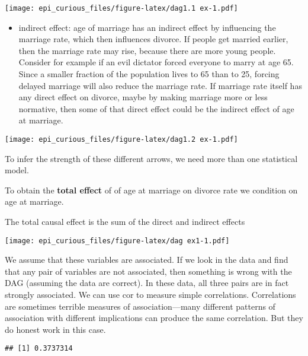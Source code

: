 \documentclass[
]{article}
\newenvironment{Shaded}{\begin{snugshade}}{\end{snugshade}}
\newcommand{\KeywordTok}[1]{\textcolor[rgb]{0.13,0.29,0.53}{\textbf{#1}}}
\newcommand{\NormalTok}[1]{#1}
\newcommand{\OperatorTok}[1]{\textcolor[rgb]{0.81,0.36,0.00}{\textbf{#1}}}
\providecommand{\tightlist}{%
  \setlength{\itemsep}{0pt}\setlength{\parskip}{0pt}}
\begin{document}
\texttt{[image: epi\_curious\_files/figure-latex/dag1.1 ex-1.pdf]}

\begin{itemize}
\tightlist
\item
  indirect effect: age of marriage has an indirect effect by influencing
  the marriage rate, which then influences divorce. If people get
  married earlier, then the marriage rate may rise, because there are
  more young people. Consider for example if an evil dictator forced
  everyone to marry at age 65. Since a smaller fraction of the
  population lives to 65 than to 25, forcing delayed marriage will also
  reduce the marriage rate. If marriage rate itself has any direct
  effect on divorce, maybe by making marriage more or less normative,
  then some of that direct effect could be the indirect effect of age at
  marriage.
\end{itemize}

\texttt{[image: epi\_curious\_files/figure-latex/dag1.2 ex-1.pdf]}

To infer the strength of these different arrows, we need more than one
statistical model.

To obtain the \textbf{total effect} of of age at marriage on divorce
rate we condition on age at marriage.

The total causal effect is the sum of the direct and indirect effects

\texttt{[image: epi\_curious\_files/figure-latex/dag ex1-1.pdf]}

We assume that these variables are associated. If we look in the data
and find that any pair of variables are not associated, then something
is wrong with the DAG (assuming the data are correct). In these data,
all three pairs are in fact strongly associated. We can use cor to
measure simple correlations. Correlations are sometimes terrible
measures of association---many different patterns of association with
different implications can produce the same correlation. But they do
honest work in this case.

\begin{Shaded}
\end{Shaded}

\begin{verbatim}
## [1] 0.3737314
\end{verbatim}
\end{document}
